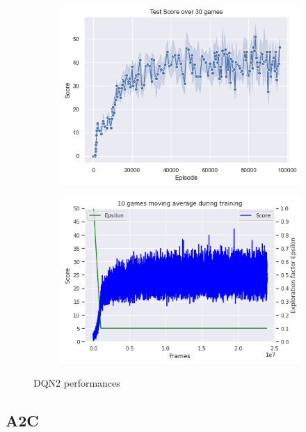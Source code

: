 \documentclass{article}
\begin{document}
\begin{figure}[H]
\centering
\begin{subfigure}{0.49\textwidth}
\centering
\includegraphics[scale=0.42]{DQNTestScore.PNG}
\end{subfigure}
\begin{subfigure}{0.49\textwidth}
\centering
\includegraphics[scale=0.42]{DQNMovAvgTraining.PNG}
\end{subfigure}
\caption{DQN2 performances}
\label{fig:DQN2}
\end{figure}


\subsection{A2C}
\end{document}
